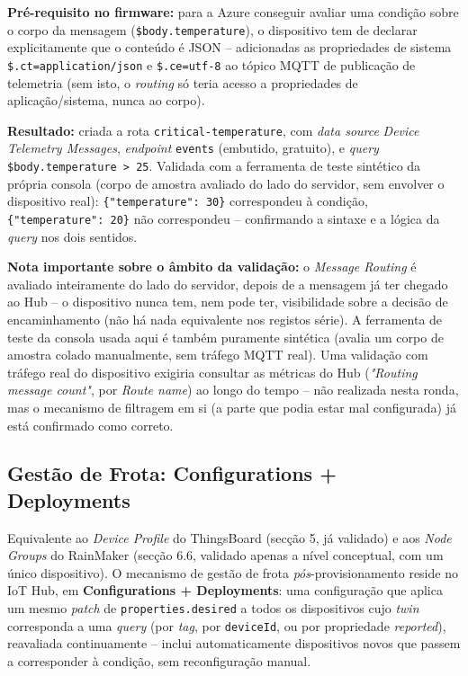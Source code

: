 \documentclass[a4paper,12pt]{article}
\begin{document}
\textbf{Pré-requisito no firmware:} para a Azure conseguir avaliar uma condição sobre o corpo da mensagem (\texttt{\$body.temperature}), o dispositivo tem de declarar explicitamente que o conteúdo é JSON -- adicionadas as propriedades de sistema \texttt{\$.ct=application/json} e \texttt{\$.ce=utf-8} ao tópico MQTT de publicação de telemetria (sem isto, o \textit{routing} só teria acesso a propriedades de aplicação/sistema, nunca ao corpo).

\textbf{Resultado:} criada a rota \texttt{critical-temperature}, com \textit{data source} \textit{Device Telemetry Messages}, \textit{endpoint} \texttt{events} (embutido, gratuito), e \textit{query} \texttt{\$body.temperature > 25}. Validada com a ferramenta de teste sintético da própria consola (corpo de amostra avaliado do lado do servidor, sem envolver o dispositivo real): \texttt{\{"temperature": 30\}} correspondeu à condição, \texttt{\{"temperature": 20\}} não correspondeu -- confirmando a sintaxe e a lógica da \textit{query} nos dois sentidos.

\textbf{Nota importante sobre o âmbito da validação:} o \textit{Message Routing} é avaliado inteiramente do lado do servidor, depois de a mensagem já ter chegado ao Hub -- o dispositivo nunca tem, nem pode ter, visibilidade sobre a decisão de encaminhamento (não há nada equivalente nos registos série). A ferramenta de teste da consola usada aqui é também puramente sintética (avalia um corpo de amostra colado manualmente, sem tráfego MQTT real). Uma validação com tráfego real do dispositivo exigiria consultar as métricas do Hub (\textit{"Routing message count"}, por \textit{Route name}) ao longo do tempo -- não realizada nesta ronda, mas o mecanismo de filtragem em si (a parte que podia estar mal configurada) já está confirmado como correto.

\subsection{Gestão de Frota: Configurations + Deployments}
Equivalente ao \textit{Device Profile} do ThingsBoard (secção 5, já validado) e aos \textit{Node Groups} do RainMaker (secção 6.6, validado apenas a nível conceptual, com um único dispositivo). O mecanismo de gestão de frota \textit{pós}-provisionamento reside no IoT Hub, em \textbf{Configurations + Deployments}: uma configuração que aplica um mesmo \textit{patch} de \texttt{properties.desired} a todos os dispositivos cujo \textit{twin} corresponda a uma \textit{query} (por \textit{tag}, por \texttt{deviceId}, ou por propriedade \textit{reported}), reavaliada continuamente -- inclui automaticamente dispositivos novos que passem a corresponder à condição, sem reconfiguração manual.
\end{document}
